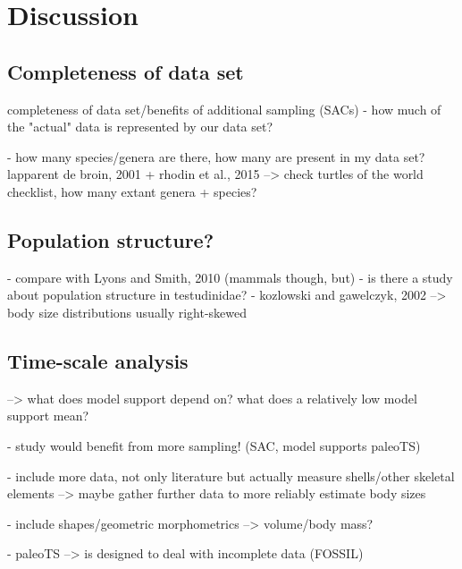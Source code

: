 \section{Discussion}

\subsection{Completeness of data set}

completeness of data set/benefits of additional sampling (SACs)
- how much of the "actual" data is represented by our data set?

- how many species/genera are there, how many are present in my data set?
lapparent de broin, 2001 + rhodin et al., 2015
--> check turtles of the world checklist, how many extant genera + species?


\subsection{Population structure?}

- compare with Lyons and Smith, 2010 (mammals though, but)
- is there a study about population structure in testudinidae?
- kozlowski and gawelczyk, 2002 --> body size distributions usually right-skewed

\subsection{Time-scale analysis}

--> what does model support depend on? what does a relatively low model support mean?




- study would benefit from more sampling! (SAC, model supports paleoTS)

- include more data, not only literature but actually measure shells/other skeletal elements --> maybe gather further data to more reliably estimate body sizes

- include shapes/geometric morphometrics --> volume/body mass?

- paleoTS --> is designed to deal with incomplete data (FOSSIL)

